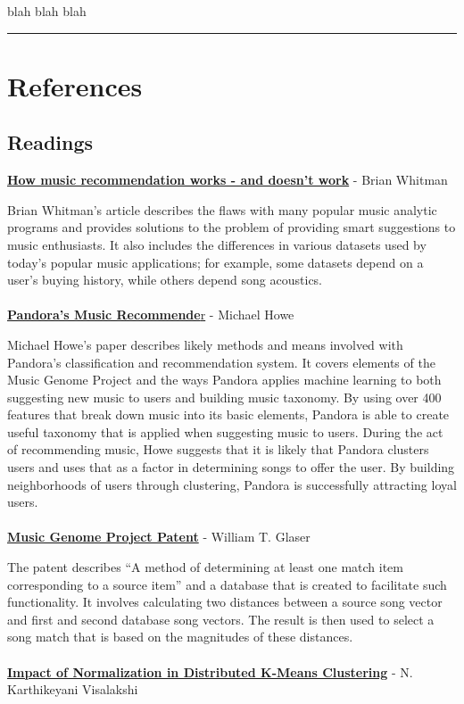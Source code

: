 \documentclass[12pt]{article}
\newcommand{\horizontalLine}{
	\begin{center}
		\hrule width 1.0\textwidth
	\end{center}
}
\begin{document}
blah blah blah

\horizontalLine
\section{References}
\label{sec:references}

\subsection{Readings}
\href{http://notes.variogr.am/post/37675885491/how-music-recommendation-works-and-doesnt-work}{\textbf{How music recommendation works - and doesn't work}} - Brian Whitman

Brian Whitman's article describes the flaws with many popular music analytic programs and provides solutions to the problem of providing smart suggestions to music enthusiasts. It also includes the differences in various datasets used by today's popular music applications; for example, some datasets depend on a user's buying history, while others depend song acoustics.
\\
\\
\href{http://courses.cs.washington.edu/courses/csep521/07wi/prj/michael.pdf}{\textbf{Pandora's Music Recommende}r} - Michael Howe 

Michael Howe's paper describes likely methods and means involved with Pandora's classification and recommendation system. It covers elements of the Music Genome Project and the ways Pandora applies machine learning to both suggesting new music to users and building music taxonomy. By using over 400 features that break down music into its basic elements, Pandora is able to create useful taxonomy that is applied when suggesting music to users. During the act of recommending music, Howe suggests that it is likely that Pandora clusters users and uses that as a factor in determining songs to offer the user. By building neighborhoods of users through clustering, Pandora is successfully attracting loyal users.
\\
\\
\href{http://www.google.com/patents/US7003515?dq=7,003,515}{\textbf{Music Genome Project Patent}} - William T. Glaser 

The patent describes  ``A method of determining at least one match item corresponding to a source item'' and a database that is created to facilitate such functionality. It involves calculating two distances between a source song vector and  first and second database song vectors. The result is then used to select a song match that is based on the magnitudes of these distances.
\\
\\
\href{http://www.medwelljournals.com/fulltext/?doi=ijscomp.2009.168.172}{\textbf{Impact of Normalization in Distributed K-Means Clustering}} - N. Karthikeyani Visalakshi 
\end{document}
